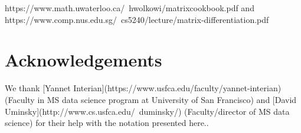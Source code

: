 \documentclass[11pt]{article}
\newcommand{\cut}[1]{}
\begin{document}
https://www.math.uwaterloo.ca/~hwolkowi/matrixcookbook.pdf and  https://www.comp.nus.edu.sg/~cs5240/lecture/matrix-differentiation.pdf
 
\section{Acknowledgements}

We thank [Yannet Interian](https://www.usfca.edu/faculty/yannet-interian) (Faculty in MS data science program at University of San Francisco) and [David Uminsky](http://www.cs.usfca.edu/~duminsky/) (Faculty/director of MS data science) for their help with the notation presented here..

\cut{
\section{NOTES}

Need [law of total derivative](https://en.wikipedia.org/wiki/Total\_derivative)

position $y = distance/time * time$ bump $delta y = distance/time * delta time$

{\bf Ex.} Let $f(x,y) = sin(xy)$. Substitute $u = xy$, giving $f(x,y) = sin(u(x,y))$ or just $sin(u)$. Chain rule says

$\frac{\partial f}{\partial x} = \frac{\partial f}{\partial u}\frac{\partial u}{\partial x} = cos(u)y = cos(xy)y$

and

$\frac{\partial f}{\partial y} = \frac{\partial f}{\partial u}\frac{\partial u}{\partial y} = cos(u)x = cos(xy)x$

General chain rule says $\frac{\partial}{\partial t} f(x(t),y(t)) = \frac{\partial f}{\partial x}\frac{\partial x}{\partial t} + \frac{\partial f}{\partial y}\frac{\partial y}{\partial t}$. Where is $t$ in my $sin(xy)$??? AND, where is the addition it says I need? How do I get partial w.r.t. $x$ or $y$?

{\bf Ex.} Let $f(x,y) = sin(xy)x$. Subst

$u = xy$\\
$v = sin(u)$\\
$w = vx$

Chain rule finally shows an addition of $\frac{\partial w}{\partial x}$ at the top level $w$:

$\frac{\partial f(x,y)}{\partial x} = \frac{\partial w(v,x)}{\partial x} = \frac{\partial w}{\partial v}\frac{\partial v}{\partial x} + \frac{\partial w}{\partial x} = x\frac{\partial v}{\partial x} + v$\\
$\frac{\partial v(u)}{\partial x} = \frac{\partial v}{\partial u}\frac{\partial u}{\partial x} = cos(u)y$

}
\end{document}
